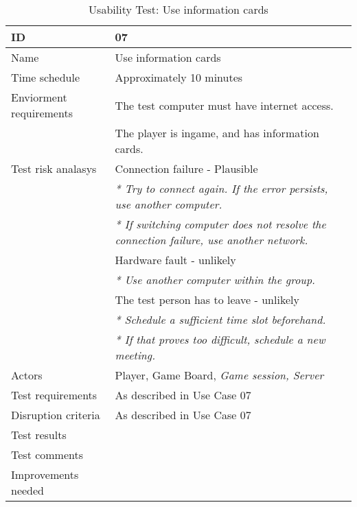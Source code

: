 {\footnotesize
\begin{table}[H]
\begin{tabular}{| p{5cm} | p{10cm} |}\hline
	\textbf{ID}	& \textbf{07} \\ \hline
	Name		& Use information cards\\ \hline
	Time schedule	& Approximately 10 minutes\\ \hline
	Enviorment requirements 
		& The test computer must have internet access. \\ 
		& The player is ingame, and has information cards.\\ \hline
	Test risk analasys 
		& Connection failure - Plausible \\
		& \emph{* Try to connect again. If the error persists, use another computer.} \\
		& \emph{* If switching computer does not resolve the connection failure, use another network.}\\
		& Hardware fault - unlikely \\
		& \emph{* Use another computer within the group.} \\
		& The test person has to leave - unlikely \\
		& \emph{* Schedule a sufficient time slot beforehand.} \\
		& \emph{* If that proves too difficult, schedule a new meeting.}\\ \hline
	Actors	& Player, Game Board, \emph{Game session, Server}\\ \hline
	Test requirements & As described in Use Case 07 \\ \hline
	Disruption criteria & As described in Use Case 07  \\ \hline
	Test results 
		& \\ \hline
	Test comments
		& \\ \hline
	Improvements needed
		& \\ \hline
\end{tabular}


\caption{Usability Test: Use information cards}
\label{fig:usability_test_7}
\end{table}}


